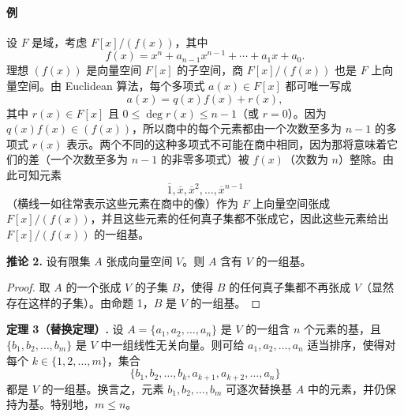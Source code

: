\paragraph{例}
设 $F$ 是域，考虑 $F[x]/(f(x))$，其中
\[
f(x)=x^n+a_{n-1}x^{n-1}+\cdots+a_1x+a_0.
\]
理想 $(f(x))$ 是向量空间 $F[x]$ 的子空间，商 $F[x]/(f(x))$ 也是 $F$ 上向量空间。由 Euclidean 算法，每个多项式 $a(x)\in F[x]$ 都可唯一写成
\[
a(x)=q(x)f(x)+r(x),
\]
其中 $r(x)\in F[x]$ 且 $0\leq \deg r(x)\leq n-1$（或 $r=0$）。因为 $q(x)f(x)\in (f(x))$，所以商中的每个元素都由一个次数至多为 $n-1$ 的多项式 $r(x)$ 表示。两个不同的这种多项式不可能在商中相同，因为那将意味着它们的差（一个次数至多为 $n-1$ 的非零多项式）被 $f(x)$（次数为 $n$）整除。由此可知元素
\[
\overline{1},\overline{x},\overline{x}^2,\ldots,\overline{x}^{n-1}
\]
（横线一如往常表示这些元素在商中的像）作为 $F$ 上向量空间张成 $F[x]/(f(x))$，并且这些元素的任何真子集都不张成它，因此这些元素给出 $F[x]/(f(x))$ 的一组基。

\noindent\textbf{推论 2.} 设有限集 $A$ 张成向量空间 $V$。则 $A$ 含有 $V$ 的一组基。

\begin{proof}
取 $A$ 的一个张成 $V$ 的子集 $B$，使得 $B$ 的任何真子集都不再张成 $V$（显然存在这样的子集）。由命题 1，$B$ 是 $V$ 的一组基。
\end{proof}

\noindent\textbf{定理 3（替换定理）.} 设 $A=\{a_1,a_2,\ldots,a_n\}$ 是 $V$ 的一组含 $n$ 个元素的基，且 $\{b_1,b_2,\ldots,b_m\}$ 是 $V$ 中一组线性无关向量。则可给 $a_1,a_2,\ldots,a_n$ 适当排序，使得对每个 $k\in\{1,2,\ldots,m\}$，集合
\[
\{b_1,b_2,\ldots,b_k,a_{k+1},a_{k+2},\ldots,a_n\}
\]
都是 $V$ 的一组基。换言之，元素 $b_1,b_2,\ldots,b_m$ 可逐次替换基 $A$ 中的元素，并仍保持为基。特别地，$m\leq n$。


